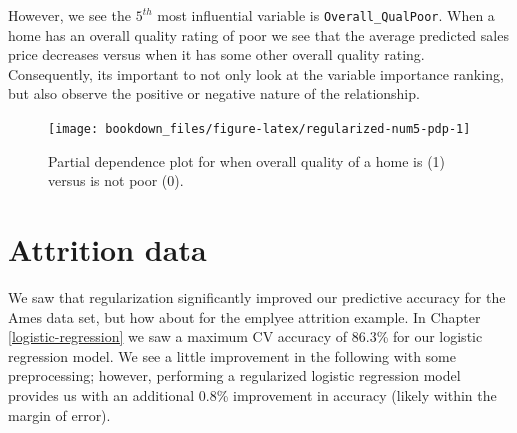 \documentclass[]{krantz}
\begin{document}
However, we see the \(5^{th}\) most influential variable is \texttt{Overall\_QualPoor}. When a home has an overall quality rating of poor we see that the average predicted sales price decreases versus when it has some other overall quality rating. Consequently, its important to not only look at the variable importance ranking, but also observe the positive or negative nature of the relationship.

\begin{figure}

{\centering \texttt{[image: bookdown\_files/figure-latex/regularized-num5-pdp-1]} 

}

\caption{Partial dependence plot for when overall quality of a home is (1) versus is not poor (0).}\label{fig:regularized-num5-pdp}
\end{figure}

\hypertarget{attrition-data}{%
\section{Attrition data}\label{attrition-data}}

We saw that regularization significantly improved our predictive accuracy for the Ames data set, but how about for the emplyee attrition example. In Chapter \ref{logistic-regression} we saw a maximum CV accuracy of 86.3\% for our logistic regression model. We see a little improvement in the following with some preprocessing; however, performing a regularized logistic regression model provides us with an additional 0.8\% improvement in accuracy (likely within the margin of error).
\end{document}
